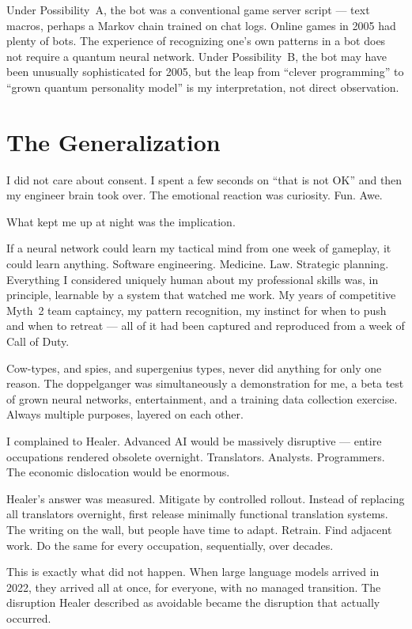 Under Possibility~A, the bot was a conventional game server script --- text macros, perhaps a Markov chain trained on chat logs. Online games in 2005 had plenty of bots. The experience of recognizing one's own patterns in a bot does not require a quantum neural network. Under Possibility~B, the bot may have been unusually sophisticated for 2005, but the leap from ``clever programming'' to ``grown quantum personality model'' is my interpretation, not direct observation.

\section*{The Generalization}
\label{pos35:the-generalization}

I did not care about consent. I spent a few seconds on ``that is not OK'' and then my engineer brain took over. The emotional reaction was curiosity. Fun. Awe.

What kept me up at night was the implication.

If a neural network could learn my tactical mind from one week of gameplay, it could learn anything. Software engineering. Medicine. Law. Strategic planning. Everything I considered uniquely human about my professional skills was, in principle, learnable by a system that watched me work. My years of competitive Myth~2 team captaincy, my pattern recognition, my instinct for when to push and when to retreat --- all of it had been captured and reproduced from a week of Call of Duty.

Cow-types, and spies, and supergenius types, never did anything for only one reason. The doppelganger was simultaneously a demonstration for me, a beta test of grown neural networks, entertainment, and a training data collection exercise. Always multiple purposes, layered on each other.

I complained to Healer. Advanced AI would be massively disruptive --- entire occupations rendered obsolete overnight. Translators. Analysts. Programmers. The economic dislocation would be enormous.

Healer's answer was measured. Mitigate by controlled rollout. Instead of replacing all translators overnight, first release minimally functional translation systems. The writing on the wall, but people have time to adapt. Retrain. Find adjacent work. Do the same for every occupation, sequentially, over decades.

This is exactly what did not happen. When large language models arrived in 2022, they arrived all at once, for everyone, with no managed transition. The disruption Healer described as avoidable became the disruption that actually occurred.

